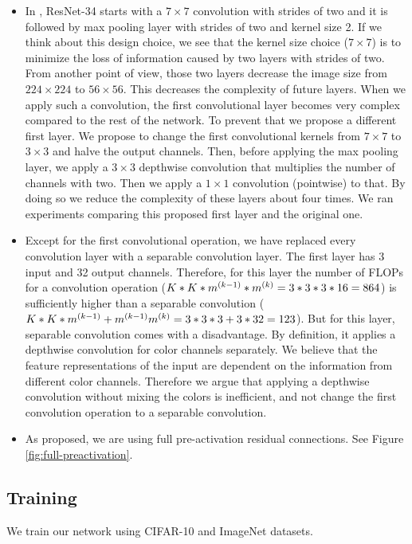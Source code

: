 \begin{itemize}
\item In \cite{He:2015aa}, ResNet-34 starts with a $7 \times 7$ convolution with strides of two and it is followed by max pooling layer with strides of two and kernel size 2. If we think about this design choice, we see that the kernel size choice ($7 \times 7$) is to minimize the loss of information caused by two layers with strides of two. From another point of view, those two layers decrease the image size from $224 \times 224$ to $56 \times 56$. This decreases the complexity of future layers. When we apply such a convolution, the first convolutional layer becomes very complex compared to the rest of the network. To prevent that we propose a different first layer. We propose to change the first convolutional kernels from $7 \times 7$ to $3 \times 3$ and halve the output channels. Then, before applying the max pooling layer, we apply a $3 \times 3$ depthwise convolution that multiplies the number of channels with two. Then we apply a $1 \times 1$ convolution (pointwise) to that.  By doing so we reduce the complexity of these layers about four times. We ran experiments comparing this proposed first layer and the original one.
\item Except for the first convolutional operation, we have replaced every convolution layer with a separable convolution layer. The first layer has 3 input and 32 output channels. Therefore, for this layer the number of FLOPs for a convolution operation ($K*K*m^{(k-1)}*m^{(k)} = 3*3*3*16 = 864$) is sufficiently higher than a separable convolution ($K*K*m^{(k-1)} + m^{(k-1)}m^{(k)} = 3*3*3 + 3*32=123$). But for this layer, separable convolution comes with a disadvantage. By definition, it applies a depthwise convolution for color channels separately. We believe that the feature representations of the input are dependent on the information from different color channels. Therefore we argue that applying a depthwise convolution without mixing the colors is inefficient, and not change the first convolution operation to a separable convolution.
\item As \cite{he2016identity} proposed, we are using full pre-activation residual connections. See Figure \ref{fig:full-preactivation}.
\end{itemize}

\subsection{Training}
We train our network using CIFAR-10 and ImageNet datasets. 

